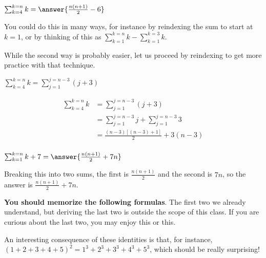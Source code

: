 \documentclass{ximera}
\begin{document}
\begin{question}
	$\sum_{k=4}^{k=n} k = \answer{ \frac{n(n+1)}{2} - 6}$
		\begin{hint}
			You could do this in many ways, for instance by reindexing the sum to start at $k=1$, or by thinking of this as $\sum_{k=1}^{k=n} k -\sum_{k=1}^{k=3} k $.
		\end{hint}
		\begin{hint}
			While the second way is probably easier, let us proceed by reindexing to get more practice with that technique.
			
			$\sum_{k=4}^{k=n} k  =\sum_{j=1}^{j=n-3} (j+3)$
		\end{hint}
		\begin{hint}
			\begin{align*}
				\sum_{k=4}^{k=n} k  &= \sum_{j=1}^{j=n-3} (j+3)\\
				&= \sum_{j=1}^{j=n-3} j + \sum_{j=1}^{j=n-3} 3\\
				&= \frac{(n-3)[(n-3)+1]}{2} + 3(n-3)\\
			\end{align*}
		\end{hint}
\end{question}

\begin{question}
	$\sum_{k=1}^{k=n} k+7  = \answer{ \frac{n(n+1)}{2} +7n}$
	\begin{hint}
		Breaking this into two sums, the first is $\frac{n(n+1)}{2}$ and the second is $7n$, so the answer is $\frac{n(n+1)}{2} +7n$.
	\end{hint}
\end{question}

\textbf{You should memorize the following formulas}. The first two we already understand, but deriving the last two is outside the scope of this class.  If you are curious about the last two, you may enjoy this or this.


An interesting consequence of these identities is that, for instance, $(1+2+3+4+5)^2 = 1^3+2^3+3^3+4^3+5^3$, which should be really surprising!
\end{document}
